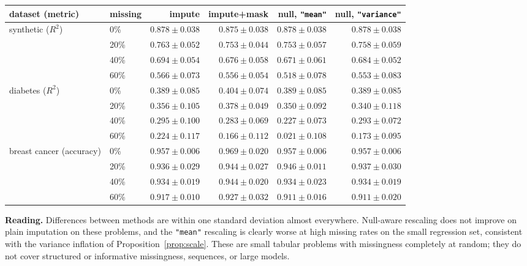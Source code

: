 \documentclass[11pt,a4paper]{article}
\theoremstyle{definition}
\theoremstyle{remark}
\begin{document}
\begin{center}
\footnotesize\setlength{\tabcolsep}{4pt}
\begin{tabular}{llrrrr}
\toprule
dataset (metric) & missing & impute & impute+mask & null, \texttt{"mean"} & null, \texttt{"variance"}\\
\midrule
synthetic ($R^2$)        & 0\%  & $0.878\pm0.038$ & $0.875\pm0.038$ & $0.878\pm0.038$ & $0.878\pm0.038$\\
                         & 20\% & $0.763\pm0.052$ & $0.753\pm0.044$ & $0.753\pm0.057$ & $0.758\pm0.059$\\
                         & 40\% & $0.694\pm0.054$ & $0.676\pm0.058$ & $0.671\pm0.061$ & $0.684\pm0.052$\\
                         & 60\% & $0.566\pm0.073$ & $0.556\pm0.054$ & $0.518\pm0.078$ & $0.553\pm0.083$\\
\midrule
diabetes ($R^2$)         & 0\%  & $0.389\pm0.085$ & $0.404\pm0.074$ & $0.389\pm0.085$ & $0.389\pm0.085$\\
                         & 20\% & $0.356\pm0.105$ & $0.378\pm0.049$ & $0.350\pm0.092$ & $0.340\pm0.118$\\
                         & 40\% & $0.295\pm0.100$ & $0.283\pm0.069$ & $0.227\pm0.073$ & $0.293\pm0.072$\\
                         & 60\% & $0.224\pm0.117$ & $0.166\pm0.112$ & $0.021\pm0.108$ & $0.173\pm0.095$\\
\midrule
breast cancer (accuracy) & 0\%  & $0.957\pm0.006$ & $0.969\pm0.020$ & $0.957\pm0.006$ & $0.957\pm0.006$\\
                         & 20\% & $0.936\pm0.029$ & $0.944\pm0.027$ & $0.946\pm0.011$ & $0.937\pm0.030$\\
                         & 40\% & $0.934\pm0.019$ & $0.944\pm0.020$ & $0.934\pm0.023$ & $0.934\pm0.019$\\
                         & 60\% & $0.917\pm0.010$ & $0.927\pm0.032$ & $0.911\pm0.016$ & $0.911\pm0.020$\\
\bottomrule
\end{tabular}
\end{center}

\noindent\textbf{Reading.} Differences between methods are within one
standard deviation almost everywhere. Null-aware rescaling does not improve
on plain imputation on these problems, and the \texttt{"mean"} rescaling is
clearly worse at high missing rates on the small regression set, consistent
with the variance inflation of Proposition~\ref{prop:scale}. These are small
tabular problems with missingness completely at random; they do not cover
structured or informative missingness, sequences, or large models.
\end{document}
